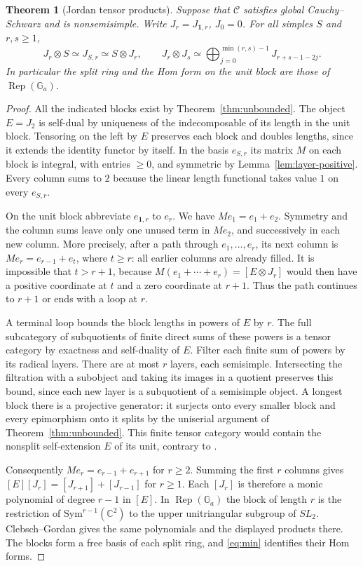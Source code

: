 \documentclass[11pt,reqno]{amsart}
\newtheorem{theorem}{Theorem}[section]
\theoremstyle{definition}
\newcommand{\one}{\mathbf 1}
\newcommand{\C}{\mathcal C}
\newcommand{\CC}{\mathbb C}
\newcommand{\Ga}{\mathbb G_a}
\newcommand{\Rep}{\operatorname{Rep}}
\begin{document}
\begin{theorem}[Jordan tensor products]\label{thm:universal-jordan}
Suppose that $\C$ satisfies global Cauchy--Schwarz and is nonsemisimple.
Write $J_r=J_{\one,r}$, $J_0=0$. For all simples $S$ and $r,s\geq1$,
\[
 J_r\otimes S\simeq J_{S,r}\simeq S\otimes J_r,\qquad
 J_r\otimes J_s\simeq\bigoplus_{j=0}^{\min(r,s)-1}J_{r+s-1-2j}.
\]
In particular the split ring and the Hom form on the unit block are those of
$\Rep(\Ga)$.
\end{theorem}
\begin{proof}
All the indicated blocks exist by Theorem~\ref{thm:unbounded}. The object
$E=J_2$ is self-dual by uniqueness of the indecomposable of its length in
the unit block. Tensoring on the left by $E$ preserves each block and doubles
lengths, since it extends the identity functor by itself. In the basis
$e_{S,r}$ its matrix $M$ on each block is integral, with entries $\geq0$, and symmetric
by Lemma~\ref{lem:layer-positive}. Every column sums to $2$ because the
linear length functional takes value $1$ on every $e_{S,r}$.

On the unit block abbreviate $e_{\one,r}$ to $e_r$. We have $Me_1=e_1+e_2$.
Symmetry and the column sums leave only one unused term in $Me_2$, and
successively in each new column. More precisely, after a path through
$e_1,\ldots,e_r$, its next column is $Me_r=e_{r-1}+e_t$, where $t\geq r$:
all earlier columns are already filled. It is impossible that $t>r+1$,
because $M(e_1+\cdots+e_r)=[E\otimes J_r]$ would then have a positive
coordinate at $t$ and a zero coordinate at $r+1$. Thus the path continues
to $r+1$ or ends with a loop at $r$.

A terminal loop bounds the block lengths in powers of $E$ by $r$. The full subcategory of subquotients of finite direct sums of these powers is a tensor category by exactness and self-duality of $E$. Filter each finite sum of powers by its radical layers. There are at most $r$ layers, each semisimple. Intersecting the filtration with a subobject and taking its images in a quotient preserves this bound, since each new layer is a subquotient of a semisimple object. A longest block there is a projective generator: it surjects onto every smaller block and every epimorphism onto it splits by the uniserial argument of Theorem~\ref{thm:unbounded}. This finite tensor category would contain the nonsplit self-extension $E$ of its unit, contrary to \cite[Theorem~4.4.1]{EGNO}.

Consequently $Me_r=e_{r-1}+e_{r+1}$ for $r\geq2$. Summing the first $r$
columns gives $[E][J_r]=[J_{r+1}]+[J_{r-1}]$ for $r\geq1$. Each $[J_r]$
is therefore a monic polynomial of degree $r-1$ in $[E]$. In $\Rep(\Ga)$ the
block of length $r$ is the restriction of $\mathrm{Sym}^{r-1}(\CC^2)$
to the upper unitriangular subgroup of $SL_2$. Clebsch--Gordan gives the
same polynomials and the displayed products there. The blocks form a free
basis of each split ring, and \eqref{eq:min} identifies their Hom forms.


\end{proof}
\end{document}
